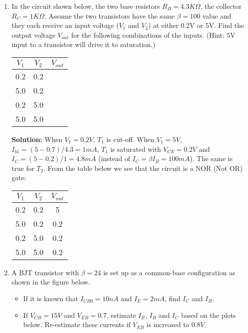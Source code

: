 \begin{enumerate}

\item In the circuit shown below, the two base resistors $R_B=4.3K\Omega$,
the collector $R_C=1K\Omega$. Assume the two transistors have the same 
$\beta=100$ value and they each receive an input voltage ($V_1$ and $V_2$)
at either 0.2V or 5V. Find the output voltage $V_{out}$ for the following 
combinations of the inputs. (Hint: 5V input to a transistor will drive it 
to saturation.)

\begin{tabular}{cc|c}\hline
$V_1$ & $V_2$ & $V_{out}$ \\ \hline
 0.2  &  0.2  &           \\ \hline
 5.0  &  0.2  &           \\ \hline
 0.2  &  5.0  &           \\ \hline
 5.0  &  5.0  &           \\ \hline
\end{tabular}


{\bf Solution:} When $V_1=0.2V$, $T_1$ is cut-off. When $V_1=5V$, 
$I_{b1}=(5-0.7)/4.3=1mA$, $T_1$ is saturated with $V_{CE}=0.2V$ and 
$I_C=(5-0.2)/1=4.8 mA$ (instead of $I_C=\beta I_B=100 mA$). The same is
true for $T_2$. From the table below we see that the circuit is a NOR
(Not OR) gate:

\begin{tabular}{cc|c}\hline
$V_1$ & $V_2$ & $V_{out}$ \\ \hline
 0.2  &  0.2  &    5      \\ \hline
 5.0  &  0.2  &    0.2    \\ \hline
 0.2  &  5.0  &    0.2    \\ \hline
 5.0  &  5.0  &    0.2    \\ \hline
\end{tabular}

\item A BJT transistor with $\beta=24$ is set up as a common-base 
configuration as shown in the figure below. 

\begin{itemize} 
\item If it is known that $I_{CB0}=10 nA$ and $I_E=2 mA$, find $I_C$ 
  and $I_B$.
\item If $V_{CB}=15V$ and $V_{EB}=0.7$, estimate $I_E$, $I_B$ and $I_C$ 
  based on the plots below. Re-estimate these currents if $V_{EB}$ is 
  increased to $0.8V$.


\end{itemize}
\end{enumerate}
